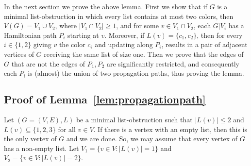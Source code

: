 \documentclass[11pt]{article}
\begin{document}
In the next section we prove the above lemma.
First we show  that if $G$ is a minimal list-obstruction in which every list contains at most two colors, then $V(G)=V_1 \cup V_2$, where $|V_1 \cap V_2| \geq 1$, and for some $v \in V_1 \cap V_2$, each $G|V_i$ has a Hamiltonian path $P_i$
starting at $v$. Moreover, if $L(v)=\{c_1,c_2\}$, then for every 
$i \in \{1,2\}$ giving $v$ the color $c_i$ and updating along $P_i$, 
results in a pair of adjacent vertices of $G$ receiving the same list of size 
one. Then  we prove that the edges of $G$ that are not the edges of
$P_1,P_2$ are significantly restricted, and consequently each $P_i$ is 
(almost) the union of two propagation paths, thus proving the lemma.


\subsection{Proof of Lemma~\ref{lem:propagationpath}}\label{sec:propagationpath}

Let $(G=(V,E),L)$ be a minimal list-obstruction such that $|L(v)|\le 2$ and
$L(v) \subseteq \{1,2,3\}$ for all $v \in V$.
If there is a vertex with an empty list, then this is the only vertex of $G$ and we are done.
So, we may assume that every vertex of $G$ has a non-empty list.
Let $V_1=\{v \in V : |L(v)|=1\}$ and $V_2=\{v \in V : |L(v)|=2\}$.
\end{document}
